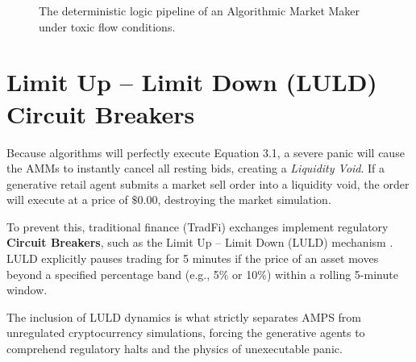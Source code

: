 \begin{figure}[htbp]
\centering
{}
\caption{The deterministic logic pipeline of an Algorithmic Market Maker under toxic flow conditions.}
\label{fig:amm_logic}
\end{figure}

\section{Limit Up -- Limit Down (LULD) Circuit Breakers}

Because algorithms will perfectly execute Equation 3.1, a severe panic will cause the AMMs to instantly cancel all resting bids, creating a \textit{Liquidity Void}. If a generative retail agent submits a market sell order into a liquidity void, the order will execute at a price of $\$0.00$, destroying the market simulation.

To prevent this, traditional finance (TradFi) exchanges implement regulatory \textbf{Circuit Breakers}, such as the Limit Up -- Limit Down (LULD) mechanism \cite{sec2012luld}. LULD explicitly pauses trading for 5 minutes if the price of an asset moves beyond a specified percentage band (e.g., 5\% or 10\%) within a rolling 5-minute window. 

The inclusion of LULD dynamics is what strictly separates AMPS from unregulated cryptocurrency simulations, forcing the generative agents to comprehend regulatory halts and the physics of unexecutable panic.
